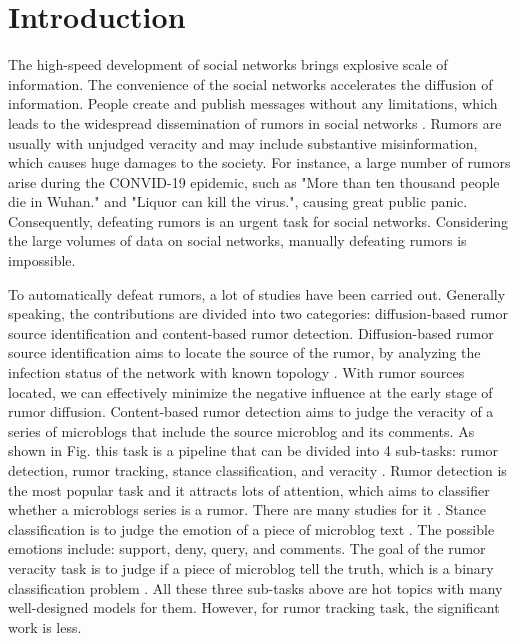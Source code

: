 \section{Introduction}
\label{sec:introduction}
The high-speed development of social networks brings explosive scale of information. The convenience of the social networks accelerates the diffusion of information. People create and publish messages without any limitations, which leads to the widespread dissemination of rumors in social networks \cite{DBLP:journals/corr/KurkaGZ15, DBLP:journals/csur/ZubiagaABLP18, DBLP:conf/sirocco/KostkaOW08, vosoughi2018spread}. Rumors are usually with unjudged veracity and may include substantive misinformation, which causes huge damages to the society. For instance, a large number of rumors arise during the CONVID-19 epidemic, such as "More than ten thousand people die in Wuhan." and "Liquor can kill the virus.", causing great public panic. Consequently, defeating rumors is an urgent task for social networks. Considering the large volumes of data on social networks, manually defeating rumors is impossible. 

To automatically defeat rumors, a lot of studies have been carried out. Generally speaking, the contributions are divided into two categories:  diffusion-based rumor source identification and content-based rumor detection. Diffusion-based rumor source identification aims to locate the source of the rumor, by analyzing the infection status of the network with known topology \cite{DBLP:conf/sigmetrics/ShahZ10, DBLP:journals/tit/ShahZ11, DBLP:conf/kdd/LappasTGM10}. With rumor sources located, we can effectively minimize the negative influence at the early stage of rumor diffusion. Content-based rumor detection aims to judge the veracity of a series of microblogs that include the source microblog and its comments. As shown in Fig. this task is a pipeline that can be divided into 4 sub-tasks: rumor detection, rumor tracking, stance classification, and veracity \cite{DBLP:journals/csur/ZubiagaABLP18, DBLP:conf/coling/KochkinaLZ18}. Rumor detection is the most popular task and it attracts lots of attention, which aims to classifier whether a microblogs series is a rumor. There are many studies for it \cite{DBLP:conf/socinfo/ZubiagaLP17, DBLP:conf/www/Ma0W19,DBLP:conf/naacl/NguyenDCD19, DBLP:journals/corr/abs-1906-05659}. Stance classification is to judge the emotion of a piece of microblog text \cite{DBLP:conf/semeval/EnayetE17, DBLP:conf/semeval/X17a, DBLP:conf/coling/ZubiagaKLPL16}. The possible emotions include: support, deny, query, and comments. The goal of the rumor veracity task is to judge if a piece of microblog tell the truth, which is a binary classification problem \cite{DBLP:conf/coling/KochkinaLZ18, DBLP:conf/acl/LiZS19, DBLP:conf/acl/KumarC19}. All these three sub-tasks above are hot topics with many well-designed models for them. However, for rumor tracking task, the significant work is less.

